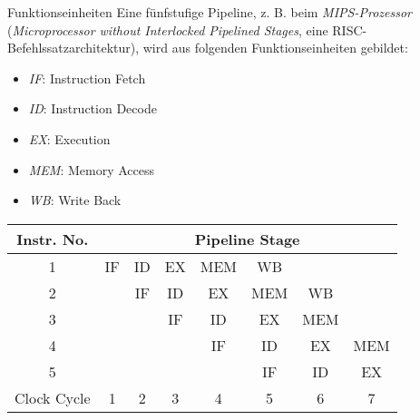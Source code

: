 \begin{defi}[Pipelining]{Funktionseinheiten}
    Eine fünfstufige Pipeline, z. B. beim \emph{MIPS-Prozessor} (\emph{Microprocessor without Interlocked Pipelined Stages}, eine RISC-Befehlssatzarchitektur), wird aus folgenden Funktionseinheiten gebildet:
    \begin{itemize}
        \item \emph{IF}: Instruction Fetch
        \item \emph{ID}: Instruction Decode
        \item \emph{EX}: Execution
        \item \emph{MEM}: Memory Access
        \item \emph{WB}: Write Back
    \end{itemize}
    
    \centering
    \begin{tabular}{|c|c|c|c|c|c|c|c|}
        \hline
        Instr. No.  & \multicolumn{7}{c|}{Pipeline Stage}                                   \\
        \hline
        \hline
        1           & IF                                  & ID & EX & MEM & WB  &     &     \\
        \hline
        2           &                                     & IF & ID & EX  & MEM & WB  &     \\
        \hline
        3           &                                     &    & IF & ID  & EX  & MEM &     \\
        \hline
        4           &                                     &    &    & IF  & ID  & EX  & MEM \\
        \hline
        5           &                                     &    &    &     & IF  & ID  & EX  \\
        \hline
        \hline
        Clock Cycle & 1                                   & 2  & 3  & 4   & 5   & 6   & 7   \\
        \hline
    \end{tabular}
\end{defi}


